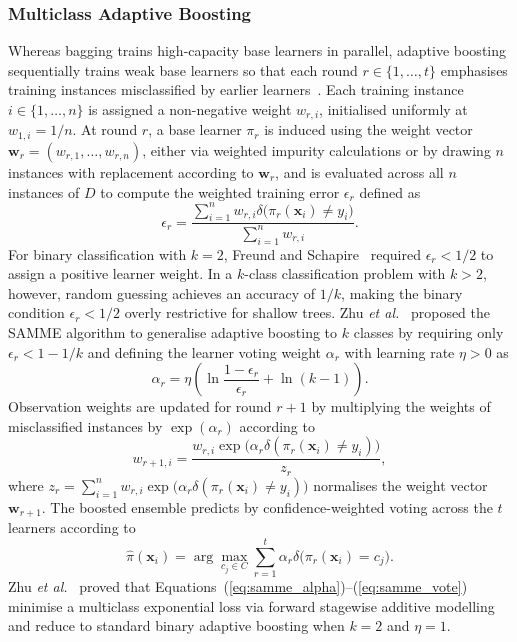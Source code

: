 \subsubsection{Multiclass Adaptive Boosting}
Whereas bagging trains high-capacity base learners in parallel, adaptive boosting sequentially trains weak base learners so that each round $r \in \{1, \dots, t\}$ emphasises training instances misclassified by earlier learners~\cite{Freund1997,Kelleher2020}. Each training instance $i \in \{1, \dots, n\}$ is assigned a non-negative weight $w_{r,i}$, initialised uniformly at $w_{1,i} = 1/n$. At round $r$, a base learner $\pi_r$ is induced using the weight vector $\mathbf{w}_r = (w_{r,1}, \dots, w_{r,n})$, either via weighted impurity calculations or by drawing $n$ instances with replacement according to $\mathbf{w}_r$, and is evaluated across all $n$ instances of $D$ to compute the weighted training error $\epsilon_r$ defined as
\begin{equation}
    \epsilon_r = \frac{\sum_{i=1}^n w_{r,i} \delta\bigl(\pi_r(\mathbf{x}_i) \ne y_i\bigr)}{\sum_{i=1}^n w_{r,i}}.
    \label{eq:boost_err}
\end{equation}
For binary classification with $k = 2$, Freund and Schapire~\cite{Freund1997} required $\epsilon_r < 1/2$ to assign a positive learner weight. In a $k$-class classification problem with $k > 2$, however, random guessing achieves an accuracy of $1/k$, making the binary condition $\epsilon_r < 1/2$ overly restrictive for shallow trees. Zhu \emph{et al.}~\cite{Zhu2009} proposed the SAMME algorithm to generalise adaptive boosting to $k$ classes by requiring only $\epsilon_r < 1 - 1/k$ and defining the learner voting weight $\alpha_r$ with learning rate $\eta > 0$ as
\begin{equation}
    \alpha_r = \eta \left( \ln \frac{1 - \epsilon_r}{\epsilon_r} + \ln(k - 1) \right).
    \label{eq:samme_alpha}
\end{equation}
Observation weights are updated for round $r + 1$ by multiplying the weights of misclassified instances by $\exp(\alpha_r)$ according to
\begin{equation}
    w_{r+1,i} = \frac{w_{r,i} \exp\bigl(\alpha_r \delta(\pi_r(\mathbf{x}_i) \ne y_i)\bigr)}{z_r},
    \label{eq:samme_update}
\end{equation}
where $z_r = \sum_{i=1}^n w_{r,i} \exp\bigl(\alpha_r \delta(\pi_r(\mathbf{x}_i) \ne y_i)\bigr)$ normalises the weight vector $\mathbf{w}_{r+1}$. The boosted ensemble predicts by confidence-weighted voting across the $t$ learners according to
\begin{equation}
    \hat{\pi}(\mathbf{x}_i) = \arg\max_{c_j \in C} \sum_{r=1}^t \alpha_r \delta\bigl(\pi_r(\mathbf{x}_i) = c_j\bigr).
    \label{eq:samme_vote}
\end{equation}
Zhu \emph{et al.}~\cite{Zhu2009} proved that Equations~(\ref{eq:samme_alpha})--(\ref{eq:samme_vote}) minimise a multiclass exponential loss via forward stagewise additive modelling and reduce to standard binary adaptive boosting when $k = 2$ and $\eta = 1$.
